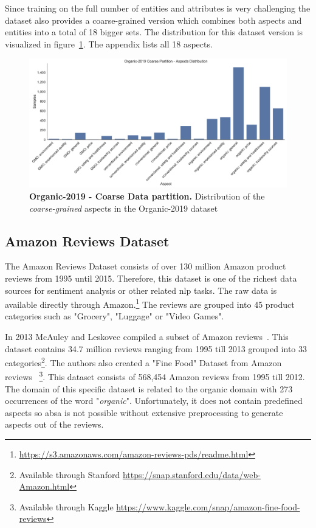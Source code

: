 Since training on the full number of entities and attributes is very challenging the dataset also provides a coarse-grained version which combines both aspects and entities into a total of 18 bigger sets. The distribution for this dataset version is visualized in figure~\ref{fig:05_organic2019_coarse}. The appendix lists all 18 aspects.

\begin{figure}[ht]
    \centering
    \includegraphics[width=\textwidth]{figures/05_setup/05_organicCoarseGrained}
    \caption{\textbf{Organic-2019 - Coarse Data partition.} Distribution of the \textit{coarse-grained} aspects in the Organic-2019 dataset}
    \label{fig:05_organic2019_coarse}
\end{figure}

\subsection{Amazon Reviews Dataset}
\label{sec:05_amazonReviews}
The Amazon Reviews Dataset consists of over 130 million Amazon product reviews from 1995 until 2015. Therefore, this dataset is one of the richest data sources for sentiment analysis or other related \gls{nlp} tasks. The raw data is available directly through Amazon.\footnote{\url{https://s3.amazonaws.com/amazon-reviews-pds/readme.html}} The reviews are grouped into 45 product categories such as "Grocery", "Luggage" or "Video Games". 
\medskip

In 2013 McAuley and Leskovec compiled a subset of Amazon reviews~\cite{McAuley2013}. This dataset contains 34.7 million reviews ranging from 1995 till 2013 grouped into 33 categories\footnote{Available through Stanford \url{https://snap.stanford.edu/data/web-Amazon.html}}. The authors also created a "Fine Food" Dataset from Amazon reviews~\cite{McAuley2013a} \footnote{Available through Kaggle \url{https://www.kaggle.com/snap/amazon-fine-food-reviews}}. This dataset consists of 568,454 Amazon reviews from 1995 till 2012. The domain of this specific dataset is related to the organic domain with 273 occurrences of the word "\textit{organic}". Unfortunately, it does not contain predefined aspects so \gls{absa} is not possible without extensive preprocessing to generate aspects out of the reviews.
\medskip

